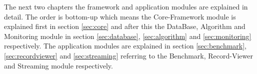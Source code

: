 The next two chapters the framework and application modules are explained in detail. The order is bottom-up which means the Core-Framework module is explained first in section \ref{sec:core} and after this the DataBase, Algorithm and Monitoring module in section \ref{sec:database}, \ref{sec:algorithm} and \ref{sec:monitoring} respectively. The application modules are explained in section \ref{sec:benchmark}, \ref{sec:recordviewer} and \ref{sec:streaming} referring to the Benchmark, Record-Viewer and Streaming module respectively.
